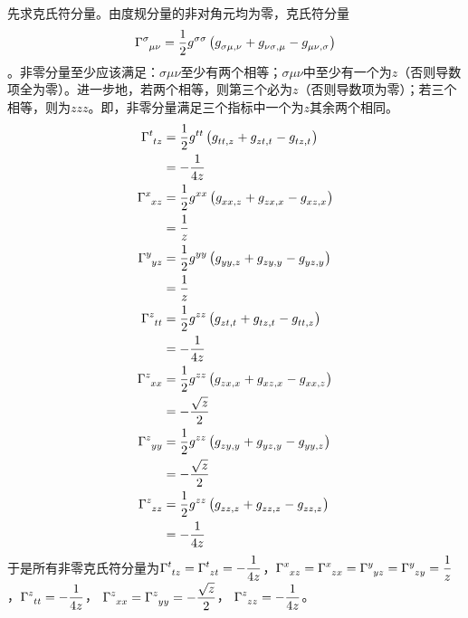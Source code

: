 \begin{xiti}
	\begin{jie}
		先求克氏符分量。由度规分量的非对角元均为零，克氏符分量\[\ChristoffelSymbol{\sigma}{\mu}{\nu}=\christoffelSymbol{\sigma}{\mu}{\nu}{\sigma}\]。非零分量至少应该满足：$\sigma\mu\nu$至少有两个相等；$\sigma\mu\nu$中至少有一个为$z$（否则导数项全为零）。进一步地，若两个相等，则第三个必为$z$（否则导数项为零）；若三个相等，则为$zzz$。即，非零分量满足三个指标中一个为$z$其余两个相同。
		\begin{align*}
		\ChristoffelSymbol{t}{t}{z}&= \christoffelSymbol{t}{t}{z}{t}\\
		&=-\frac{1}{4z}\\
		\ChristoffelSymbol{x}{x}{z}&= \christoffelSymbol{x}{x}{z}{x}\\
		&=\frac{1}{z}\\
		\ChristoffelSymbol{y}{y}{z}&= \christoffelSymbol{y}{y}{z}{y}\\
		&=\frac{1}{z}\\
		\ChristoffelSymbol{z}{t}{t}&= \christoffelSymbol{z}{t}{t}{z}\\
		&=-\frac{1}{4z}\\
		\ChristoffelSymbol{z}{x}{x}&= \christoffelSymbol{z}{x}{x}{z}\\
		&=-\frac{\sqrt{z}}{2}\\
		\ChristoffelSymbol{z}{y}{y}&= \christoffelSymbol{z}{y}{y}{z}\\
		&=-\frac{\sqrt{z}}{2}\\
		\ChristoffelSymbol{z}{z}{z}&= \christoffelSymbol{z}{z}{z}{z}\\
		&=-\frac{1}{4z}
		\end{align*}
		于是所有非零克氏符分量为$\displaystyle \ChristoffelSymbol{t}{t}{z}= \ChristoffelSymbol{t}{z}{t}= -\frac{1}{4z}$，$\displaystyle \ChristoffelSymbol{x}{x}{z}= \ChristoffelSymbol{x}{z}{x} = \ChristoffelSymbol{y}{y}{z}= \ChristoffelSymbol{y}{z}{y}= \frac{1}{z} $，$\displaystyle \ChristoffelSymbol{z}{t}{t}= -\frac{1}{4z}$， $\displaystyle \ChristoffelSymbol{z}{x}{x}= \ChristoffelSymbol{z}{y}{y}= -\frac{\sqrt{z}}{2} $， $\displaystyle \ChristoffelSymbol{z}{z}{z}= -\frac{1}{4z} $。


\end{jie}
\end{xiti}
